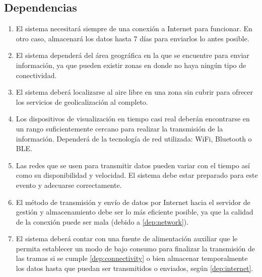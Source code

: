 \subsection*{Dependencias}
\begin{enumerate}[label=\textbf{\texttt{DEP-\arabic*}}]
  \item\label{dep:internet} El sistema necesitará siempre de una conexión a Internet para funcionar.
        En otro caso, almacenará los datos hasta 7 días para enviarlos lo antes
        posible.
  \item\label{dep:connectivity} El sistema dependerá del área geográfica en la que se encuentre para enviar
        información, ya que pueden existir zonas en donde no haya ningún tipo de
        conectividad.
  \item\label{dep:gps} El sistema deberá localizarse al aire libre en una zona sin cubrir para
        ofrecer los servicios de geolicalización al completo.
  \item\label{dep:rt} Los dispositivos de visualización en tiempo casi real deberán encontrarse
        en un rango suficientemente cercano para realizar la transmisión de la
        información. Dependerá de la tecnología de red utilizada:
        WiFi, Bluetooth o \ac{BLE}.
  \item\label{dep:network} Las redes que se usen para transmitir datos pueden variar con el tiempo
        así como su disponibilidad y velocidad. El sistema debe estar preparado
        para este evento y adecuarse correctamente.
  \item\label{dep:nt-speed} El método de transmisión y envío de datos por Internet hacia el servidor
        de gestión y almacenamiento debe ser lo más eficiente posible, ya que la
        calidad de la conexión puede ser mala (debido a \ref{dep:network}).
  \item\label{dep:battery} El sistema deberá contar con una fuente de alimentación
        auxiliar que le permita establecer un modo de bajo consumo para finalizar
        la transmisión de las tramas si se cumple \ref{dep:connectivity} o bien
        almacenar temporalmente los datos hasta que puedan ser transmitidos o enviados,
        según \ref{dep:internet}.
\end{enumerate}

